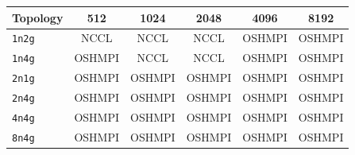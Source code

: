 \begin{tabular}{lccccc}
\toprule
Topology & 512 & 1024 & 2048 & 4096 & 8192\\
\midrule
\texttt{1n2g} & NCCL & NCCL & NCCL & OSHMPI & OSHMPI\\
\texttt{1n4g} & OSHMPI & NCCL & NCCL & OSHMPI & OSHMPI\\
\texttt{2n1g} & OSHMPI & OSHMPI & OSHMPI & OSHMPI & OSHMPI\\
\texttt{2n4g} & OSHMPI & OSHMPI & OSHMPI & OSHMPI & OSHMPI\\
\texttt{4n4g} & OSHMPI & OSHMPI & OSHMPI & OSHMPI & OSHMPI\\
\texttt{8n4g} & OSHMPI & OSHMPI & OSHMPI & OSHMPI & OSHMPI\\
\bottomrule
\end{tabular}

